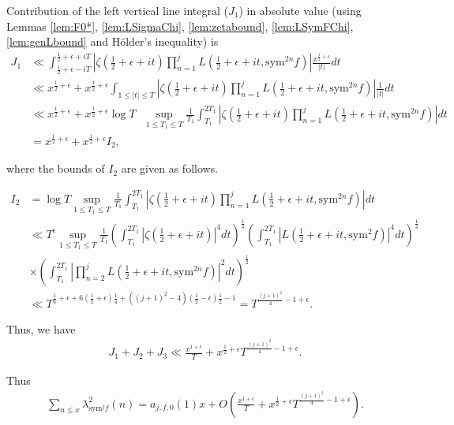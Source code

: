 \documentclass[10pt]{amsart}
\begin{document}
Contribution of the left vertical line integral ($J_{1}$) in absolute value (using Lemmas \ref{lem:F0*}, \ref{lem:LSigmaChi}, \ref{lem:zetabound}, \ref{lem:LSymFChi}, \ref{lem:genLbound} and H\"older's inequality) is
\begin{align*}
J_1 &\ll \int_{\frac{1}{2}+\epsilon-iT}^{\frac{1}{2}+\epsilon+iT}\left|\zeta(\tfrac{1}{2}+\epsilon+it)\prod_{n=1}^{j}L(\tfrac{1}{2}+\epsilon+it,\mathrm{sym}^{2n}f)\right|\frac{x^{\frac{1}{2}+\epsilon}}{|t|}dt \\
&\ll x^{\frac{1}{2}+\epsilon} + x^{\frac{1}{2}+\epsilon}\int_{1 \leq |t| \leq T}\left|\zeta(\tfrac{1}{2}+\epsilon+it)\prod_{n=1}^{j}L(\tfrac{1}{2}+\epsilon+it,\mathrm{sym}^{2n}f)\right|\frac{1}{|t|}dt \\
&\ll  x^{\frac{1}{2}+\epsilon} + x^{\frac{1}{2}+\epsilon} \log T \text{ } \sup_{1 \leq T_1 \leq T}\frac{1}{T_1} \int_{T_1}^{2T_1}\left|\zeta(\tfrac{1}{2}+\epsilon+it)\prod_{n=1}^{j}L(\tfrac{1}{2}+\epsilon+it,\mathrm{sym}^{2n}f)\right| dt \\
&= x^{\frac{1}{2}+\epsilon} + x^{\frac{1}{2}+\epsilon}I_2,
\end{align*}

where the bounds of $I_2$ are given as follows.

\begin{align}
    I_2 &=\log T \sup_{1 \leq T_1 \leq T} \frac{1}{T_1} \int_{T_1}^{2T_1}\left|\zeta(\tfrac{1}{2}+\epsilon+it)\prod_{n=1}^{j}L(\tfrac{1}{2}+\epsilon+it,\mathrm{sym}^{2n}f)\right| dt \\
    &\ll T^\epsilon \sup_{1 \leq T_1 \leq T}\frac{1}{T_1}\left(  \int_{T_1}^{2T_1}|\zeta(\frac{1}{2}+\epsilon+it)|^{4}dt \right)^\frac{1}{4}\left(\int_{T_1}^{2T_1}|L(\frac{1}{2}+\epsilon+it, \mathrm{sym}^{2}f)|^4dt\right)^\frac{1}{4} \\
    & \times \left( \int_{T_1}^{2T_1}\left| \prod_{n=2}^{j}L(\frac{1}{2}+\epsilon+it, \mathrm{sym}^{2n} f) \right|^{2}dt\right)^{\frac{1}{2}}\\
    &\ll T^{\frac{1}{4}+\epsilon + 6(\frac{1}{2}+\epsilon)\frac{1}{4}+ ((j+1)^2-4)(\frac{1}{2}-\epsilon)\frac{1}{2}-1} = T^{\frac{(j+1)^2}{4}-1+\epsilon}.
\end{align}

Thus, we have \begin{align}
    J_1+J_2+J_3 \ll \frac{x^{1+\epsilon}}{T} + x^{\frac{1}{2}+\epsilon}T^{\frac{(j+1)^2}{4}-1+\epsilon}.
\end{align}

Thus \begin{align}
    \sum_{n\leq x}\lambda_{\mathrm{sym}^{j}f}^2(n) = a_{j,f,0}(1)x + O \left( \frac{x^{1+\epsilon}}{T}+x^{\frac{1}{2}+\epsilon} T^{\frac{(j+1)^2}{4}-1+\epsilon} \right).
\end{align}
\end{document}
